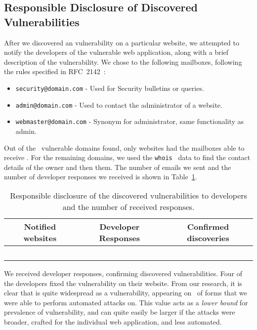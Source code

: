 \subsection{Responsible Disclosure of Discovered Vulnerabilities}
After we discovered an \ehi vulnerability on a particular website, we attempted to notify the developers of the vulnerable web application, along with a brief description of the vulnerability.
We chose to \email the following mailboxes, following the rules specified in RFC~2142~\cite{rfc2142}:
\begin{itemize}
	\item \texttt{security@domain.com} - Used for Security bulletins or queries.
	\item \texttt{admin@domain.com} - Used to contact the administrator of a website.
	\item \texttt{webmaster@domain.com} - Synonym for administrator, same functionality as admin.
\end{itemize}
 
Out of the \domains\ vulnerable domains found, only \emailedDefaultmailbox websites had the mailboxes able to receive \emails. For the remaining domains, we used the \texttt{whois}~\cite{whois} data to find the contact details of the owner and then \emailed them. The number of emails we sent and the number of developer responses we received is shown in Table~\ref{tab:devresp}.

\begin{table}[tbp]
\centering
\normalsize
\begin{tabular}{|c|c|c|}
	\hline
	\multicolumn{1}{|p{2cm}}{\centering \textbf{Notified websites}} &
	\multicolumn{1}{|p{2cm}|}{\centering \textbf{Developer Responses}} &
	\multicolumn{1}{p{2cm}|}{\centering \textbf{Confirmed discoveries}}\\
	\hline
	\domains\ & \responses & \confirmed \\
	\hline
\end{tabular}
	\caption[\titlecap{}]{Responsible disclosure of the discovered vulnerabilities to developers and the number of received responses.}
	\label{tab:devresp}
\end{table}

We received \responses developer responses, confirming \confirmed discovered vulnerabilities. Four of the developers fixed the vulnerability on their website.
From our research, it is clear that \ehi is quite widespread as a vulnerability, appearing on \successDelta\ of forms that we were able to perform automated attacks on. This value acts as a \emph{lower bound} for prevalence of \ehi vulnerability, and can quite easily be larger if the attacks were broader, crafted for the individual web application, and  less automated. 
